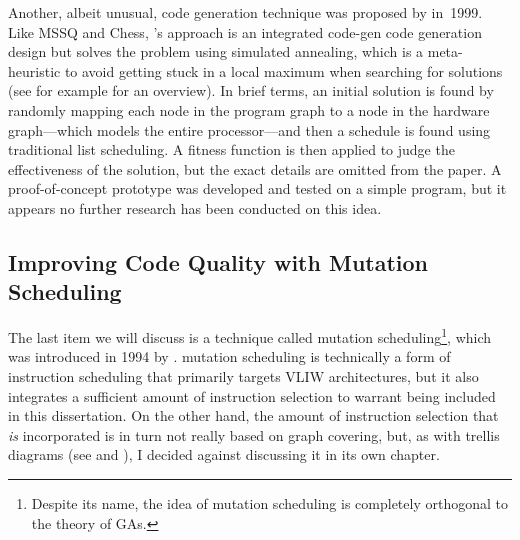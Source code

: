 Another, albeit unusual, \gls{code generation} technique was proposed by
\textcite{Visser1999} in~1999.
%
Like \gls{MSSQ} and \gls{Chess},
\citeauthor{Visser1999}'s approach is an \gls{integrated code-gen} \gls{code
  generation} design but solves the problem using \gls{simulated annealing},
which is a meta-heuristic to avoid getting stuck in a local maximum when
searching for solutions (see for example \cite{Kirkpatrick1983} for an
overview).
%
In brief terms, an initial solution is found by randomly mapping each
\gls{node} in the \gls{program graph} to a \gls{node} in the hardware
\gls{graph}---which models the entire processor---and then a schedule is found
using traditional \gls{list scheduling}.
%
A fitness function is then applied to
judge the effectiveness of the solution, but the exact details are omitted from
the paper.
%
A proof-of-concept prototype was developed and tested on a simple
\gls{program}, but it appears no further research has been conducted on this
idea.


\subsection{Improving Code Quality with Mutation Scheduling}

The last item we will discuss is a technique called \gls{mutation
  scheduling}\footnote{Despite its name, the idea of \gls{mutation scheduling}
  is completely orthogonal to the theory of \glsdesc{GA}s.}, which was
introduced in 1994 by .
%
\Gls{mutation
  scheduling} is technically a form of \gls{instruction scheduling} that
primarily targets \gls{VLIW} architectures, but it also integrates a sufficient
amount of \gls{instruction selection} to warrant being included in this dissertation.
%
On
the other hand, the amount of \gls{instruction selection} that \emph{is}
incorporated is in turn not really based on \gls{graph covering}, but, as with
\glspl{trellis diagram} (see  and
), I decided against discussing it in its own
chapter.


